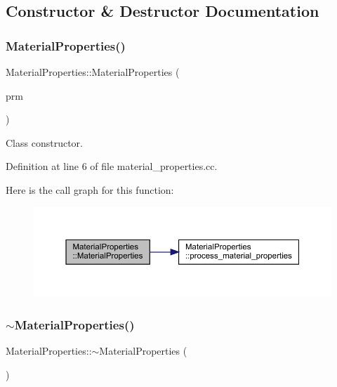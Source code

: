 \subsection{Constructor \& Destructor Documentation}
\mbox{\label{class_material_properties_a9c1a2ff5f7cfaacd4b992e96186fbf81}} 
\subsubsection{\texorpdfstring{Material\+Properties()}{MaterialProperties()}}
{\footnotesize\ttfamily Material\+Properties\+::\+Material\+Properties (\begin{DoxyParamCaption}\item[{Parameter\+Handler \&}]{prm }\end{DoxyParamCaption})}

Class constructor. 

Definition at line 6 of file material\+\_\+properties.\+cc.

Here is the call graph for this function\+:\nopagebreak
\begin{figure}[H]
\begin{center}
\leavevmode
\includegraphics[width=350pt]{class_material_properties_a9c1a2ff5f7cfaacd4b992e96186fbf81_cgraph}
\end{center}
\end{figure}
\mbox{\label{class_material_properties_aab94335e9db402f624b88603b233bcab}} 
\subsubsection{\texorpdfstring{$\sim$\+Material\+Properties()}{~MaterialProperties()}}
{\footnotesize\ttfamily Material\+Properties\+::$\sim$\+Material\+Properties (\begin{DoxyParamCaption}{ }\end{DoxyParamCaption})}



